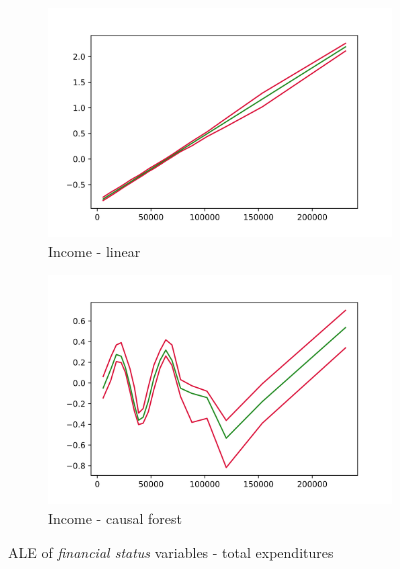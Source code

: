 \begin{figure}[h]
    \begin{subfigure}{0.5\linewidth}
        \includegraphics[width=\linewidth]{figures/ALE/chTOTexp/spec3_linear_FINCBTXM.png}
        \caption{Income - linear}
    \end{subfigure}%
    \begin{subfigure}{0.5\linewidth}
        \includegraphics[width=\linewidth]{figures/ALE/chTOTexp/spec3_cf_FINCBTXM.png}
        \caption{Income - causal forest}
    \end{subfigure}
    \caption{ALE of \textit{financial status} variables - total expenditures}
    \label{app:ale_finstat_tot}
\end{figure}

